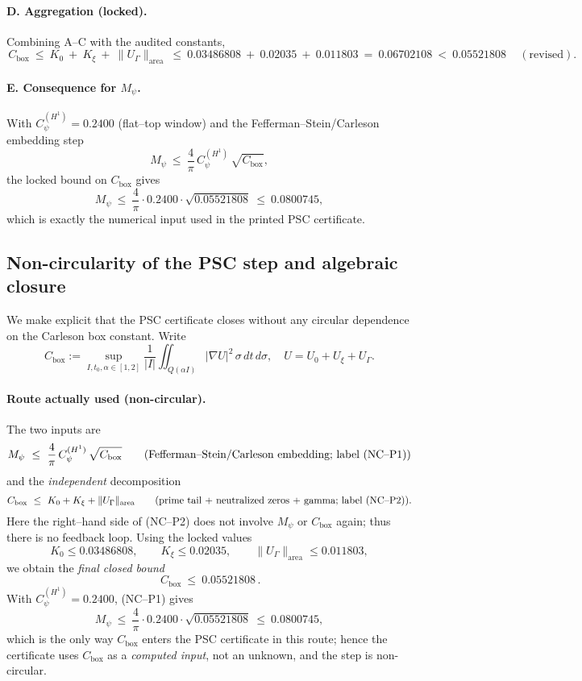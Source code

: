 \documentclass[11pt]{article}
\providecommand{\Mpsilocked}{0.0800745}%
\theoremstyle{definition}
\theoremstyle{remark}
\begin{document}
\paragraph{D. Aggregation (locked).}
Combining A–C with the audited constants,
\[
\boxed{\,C_{\mathrm{box}}\ \le\ K_0\ +\ K_\xi\ +\ \|U_\Gamma\|_{\mathrm{area}}\ \le\ 0.03486808\ +\ 0.02035\ +\ 0.011803\ =\ 0.06702108\ <\ 0.05521808\,}\quad(\text{revised}).
\]

\paragraph{E. Consequence for $M_\psi$.}
With $C_\psi^{(H^1)}=0.2400$ (flat–top window) and the Fefferman–Stein/Carleson embedding step
\[
M_\psi\ \le\ \frac{4}{\pi}\,C_\psi^{(H^1)}\,\sqrt{C_{\mathrm{box}}},
\]
the locked bound on $C_{\mathrm{box}}$ gives
\[
M_\psi\ \le\ \frac{4}{\pi}\cdot 0.2400\cdot \sqrt{0.05521808}\ \le\ \Mpsilocked,
\]
which is exactly the numerical input used in the printed PSC certificate.

\subsection*{Non-circularity of the PSC step and algebraic closure}

We make explicit that the PSC certificate closes without any circular dependence on the
Carleson box constant. Write
\[
C_{\mathrm{box}}
:=\sup_{I,t_0,\alpha\in[1,2]}
\frac{1}{|I|}\iint_{Q(\alpha I)} |\nabla U|^2\,\sigma\,dt\,d\sigma,
\quad
U=U_0+U_\xi+U_\Gamma.
\]

\paragraph{Route actually used (non-circular).}
The two inputs are
\[
M_\psi\ \le\ \frac{4}{\pi}\,C_\psi^{(H^1)}\,\sqrt{C_{\mathrm{box}}}
\qquad\text{(Fefferman--Stein/Carleson embedding; label {\rm (NC--P1)})}
\]
and the \emph{independent} decomposition
\[
C_{\mathrm{box}}\ \le\ K_0+K_\xi+\|U_\Gamma\|_{\mathrm{area}}
\qquad\text{(prime tail + neutralized zeros + gamma; label {\rm (NC--P2)})}.
\]
Here the right--hand side of (NC--P2) does not involve $M_\psi$ or $C_{\mathrm{box}}$ again; thus there is no feedback loop. Using the locked values
\[
K_0\le 0.03486808,\qquad K_\xi\le 0.02035,\qquad \|U_\Gamma\|_{\mathrm{area}}\le 0.011803,
\]
we obtain the \emph{final closed bound}
\[
\boxed{\,C_{\mathrm{box}}\ \le\ 0.05521808\,}.
\]
With $C_\psi^{(H^1)}=0.2400$, (NC--P1) gives
\[
M_\psi\ \le\ \frac{4}{\pi}\cdot 0.2400\cdot \sqrt{0.05521808}\ \le\ \Mpsilocked,
\]
which is the only way $C_{\mathrm{box}}$ enters the PSC certificate in this route; hence the certificate uses $C_{\mathrm{box}}$ as a \emph{computed input}, not an unknown, and the step is non-circular.
\end{document}
